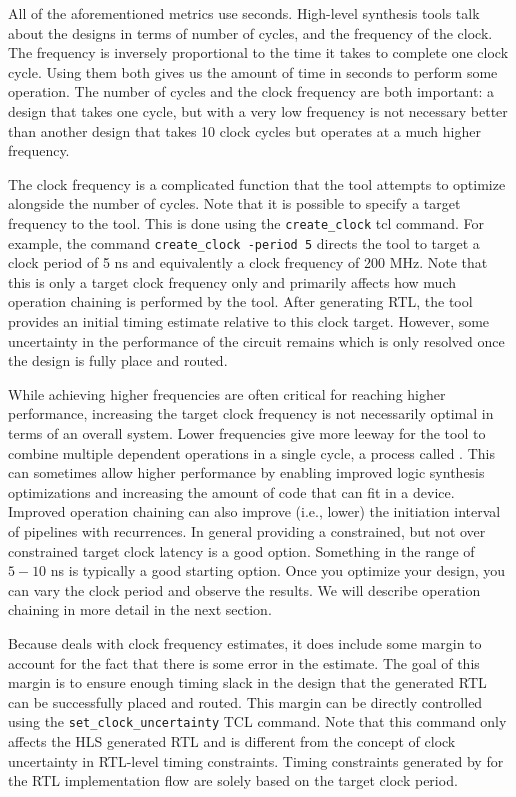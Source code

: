 All of the aforementioned metrics use seconds. High-level synthesis tools talk about the designs in terms of number of cycles, and the frequency of the clock. The frequency is inversely proportional to the time it takes to complete one clock cycle. Using them both gives us the amount of time in seconds to perform some operation. The number of cycles and the clock frequency are both important: a design that takes one cycle, but with a very low frequency is not necessary better than another design that takes 10 clock cycles but operates at a much higher frequency. 

The clock frequency is a complicated function that the \VHLS tool attempts to optimize alongside the number of cycles. Note that it is possible to specify a target frequency to the \VHLS tool. This is done using the \lstinline{create_clock} tcl command.  For example, the command \lstinline{create_clock -period 5} directs the tool to target a clock period of 5 ns and equivalently a clock frequency of 200 MHz.  Note that this is only a target clock frequency only and primarily affects how much operation chaining is performed by the tool.  After generating RTL, the \VHLS tool provides an initial timing estimate relative to this clock target.  However, some uncertainty in the performance of the circuit remains which is only resolved once the design is fully place and routed.

While achieving higher frequencies are often critical for reaching higher performance, increasing the target clock frequency  is not necessarily optimal in terms of an overall system. Lower frequencies give more leeway for the tool to combine multiple dependent operations in a single cycle, a process called . This can sometimes allow higher performance by enabling improved logic synthesis optimizations and increasing the amount of code that can fit in a device. Improved operation chaining can also improve (i.e., lower) the initiation interval of pipelines with recurrences.   In general providing a constrained, but not over constrained target clock latency is a good option. Something in the range of $5 - 10$ ns is typically a good starting option. Once you optimize your design, you can vary the clock period and observe the results. We will describe operation chaining in more detail in the next section.

Because \VHLS deals with clock frequency estimates, it does include some margin to account for the fact that there is some error in the estimate.  The goal of this margin is to ensure enough timing slack in the design that the generated RTL can be successfully placed and routed.  This margin can be directly controlled using the \lstinline{set_clock_uncertainty} TCL command.  Note that this command only affects the HLS generated RTL and is different from the concept of clock uncertainty in RTL-level timing constraints.  Timing constraints generated by \VHLS for the RTL implementation flow are solely based on the target clock period.

